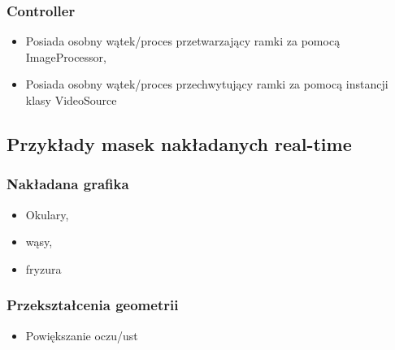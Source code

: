 \subsubsection{Controller}
\begin{itemize}
    \item Posiada osobny wątek/proces przetwarzający ramki za pomocą ImageProcessor,
    \item Posiada osobny wątek/proces przechwytujący ramki za pomocą instancji klasy VideoSource
\end{itemize}

\subsection{Przykłady masek nakładanych real-time}
\subsubsection{Nakładana grafika}
\begin{itemize}
    \item Okulary,
    \item wąsy,
    \item fryzura
\end{itemize}
\subsubsection{Przekształcenia geometrii}
\begin{itemize}
    \item Powiększanie oczu/ust
\end{itemize}
